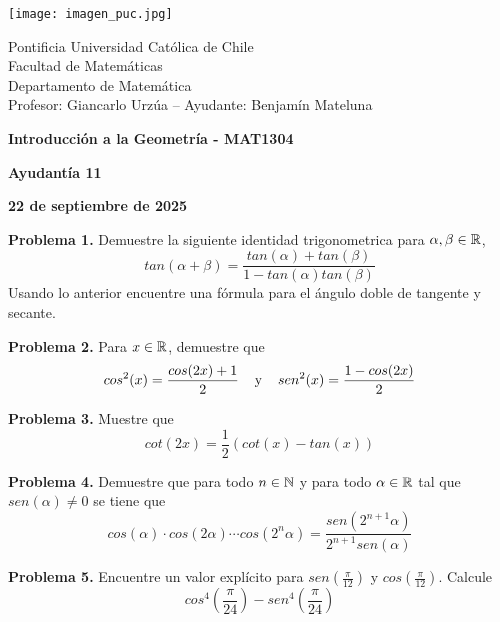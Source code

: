 \documentclass{article}
\begin{document}
\begin{minipage}{2.5cm}
    \texttt{[image: imagen\_puc.jpg]}
\end{minipage}
\begin{minipage}{14cm}
    {\sc Pontificia Universidad Católica de Chile\\
    Facultad de Matemáticas\\
    Departamento de Matemática\\
    Profesor: Giancarlo Urzúa -- Ayudante: Benjamín Mateluna}
\end{minipage}
\vspace{1ex}

{\centerline{\bf Introducción a la Geometría - MAT1304}
\centerline{\bf Ayudantía 11}}
\centerline{\bf 22 de septiembre de 2025}

\vspace{1cm}
\noindent\textbf{Problema 1.} Demuestre la siguiente identidad trigonometrica para 
$\alpha,\beta\in\mathbb{R}$,
\begin{equation*}
    tan(\alpha+\beta)=\frac{tan(\alpha)+tan(\beta)}{1-tan(\alpha)tan(\beta)}
\end{equation*}
Usando lo anterior encuentre una fórmula para el ángulo doble de tangente y secante.

\vspace{5mm}
\noindent\textbf{Problema 2.} Para $x\in\mathbb{R}$, demuestre que
\begin{equation*}
    cos^{2}(x)=\frac{cos(2x)+1}{2}\hspace{4mm}\text{y}\hspace{4mm}
    sen^{2}(x)=\frac{1-cos(2x)}{2}
\end{equation*}

\vspace{5mm}
\noindent\textbf{Problema 3.} Muestre que
\begin{equation*}
    cot(2x)=\frac{1}{2}\left(cot(x)-tan(x)\right)
\end{equation*}

\vspace{5mm}
\noindent\textbf{Problema 4.} Demuestre que para todo $n\in\mathbb{N}$ y para todo $\alpha\in\mathbb{R}$ tal que
$sen(\alpha)\neq0$ se tiene que
\begin{equation*}
    cos(\alpha)\cdot cos(2\alpha)\cdots cos(2^{n}\alpha)
    =\frac{sen(2^{n+1}\alpha)}{2^{n+1}sen(\alpha)}
\end{equation*}

\vspace{5mm}
\noindent\textbf{Problema 5.} Encuentre un valor explícito para $sen(\frac{\pi}{12})$ y
$cos(\frac{\pi}{12})$. Calcule
\begin{equation*}
    cos^{4}\left(\frac{\pi}{24}\right)-sen^{4}\left(\frac{\pi}{24}\right)
\end{equation*}

\end{document}
